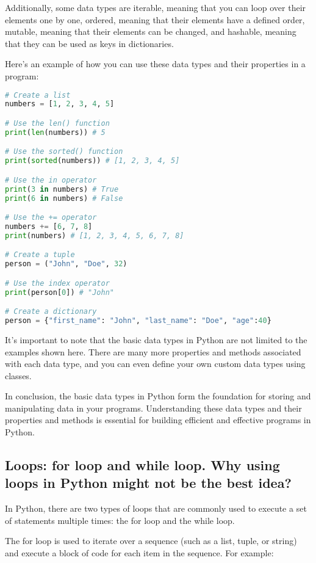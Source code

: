 \documentclass[12pt, a4paper, oneside]{article}
\begin{document}
Additionally, some data types are iterable, meaning that you can loop over their elements one by one, ordered, meaning that their elements have a defined order, mutable, meaning that their elements can be changed, and hashable, meaning that they can be used as keys in dictionaries.

Here's an example of how you can use these data types and their properties in a program:

\begin{lstlisting}[language=Python, frame=single]
# Create a list
numbers = [1, 2, 3, 4, 5]

# Use the len() function
print(len(numbers)) # 5

# Use the sorted() function
print(sorted(numbers)) # [1, 2, 3, 4, 5]

# Use the in operator
print(3 in numbers) # True
print(6 in numbers) # False

# Use the += operator
numbers += [6, 7, 8]
print(numbers) # [1, 2, 3, 4, 5, 6, 7, 8]

# Create a tuple
person = ("John", "Doe", 32)

# Use the index operator
print(person[0]) # "John"

# Create a dictionary
person = {"first_name": "John", "last_name": "Doe", "age":40}
\end{lstlisting}

It's important to note that the basic data types in Python are not limited to the examples shown here. There are many more properties and methods associated with each data type, and you can even define your own custom data types using classes.

In conclusion, the basic data types in Python form the foundation for storing and manipulating data in your programs. Understanding these data types and their properties and methods is essential for building efficient and effective programs in Python.
\subsection{ Loops: for loop and while loop. Why using loops in Python might not be the best idea? }
In Python, there are two types of loops that are commonly used to execute a set of statements multiple times: the for loop and the while loop.

The for loop is used to iterate over a sequence (such as a list, tuple, or string) and execute a block of code for each item in the sequence. For example:
\end{document}
